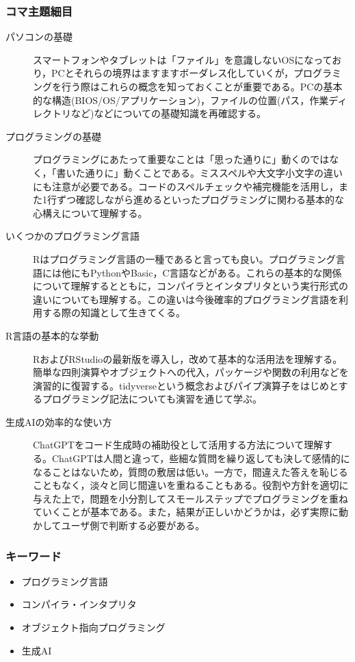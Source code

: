 \subsubsection{コマ主題細目}
\begin{description}
	\item[パソコンの基礎] スマートフォンやタブレットは「ファイル」を意識しないOSになっており，PCとそれらの境界はますますボーダレス化していくが，プログラミングを行う際はこれらの概念を知っておくことが重要である。PCの基本的な構造(BIOS/OS/アプリケーション)，ファイルの位置(パス，作業ディレクトリなど)などについての基礎知識を再確認する。
	
	\item[プログラミングの基礎] プログラミングにあたって重要なことは「思った通りに」動くのではなく，「書いた通りに」動くことである。ミススペルや大文字小文字の違いにも注意が必要である。コードのスペルチェックや補完機能を活用し，また1行ずつ確認しながら進めるといったプログラミングに関わる基本的な心構えについて理解する。

	\item[いくつかのプログラミング言語] Rはプログラミング言語の一種であると言っても良い。プログラミング言語には他にもPythonやBasic，C言語などがある。これらの基本的な関係について理解するとともに，コンパイラとインタプリタという実行形式の違いについても理解する。この違いは今後確率的プログラミング言語を利用する際の知識として生きてくる。

	\item[R言語の基本的な挙動] RおよびRStudioの最新版を導入し，改めて基本的な活用法を理解する。簡単な四則演算やオブジェクトへの代入，パッケージや関数の利用などを演習的に復習する。tidyverseという概念およびパイプ演算子をはじめとするプログラミング記法についても演習を通じて学ぶ。

	\item[生成AIの効率的な使い方] ChatGPTをコード生成時の補助役として活用する方法について理解する。ChatGPTは人間と違って，些細な質問を繰り返しても決して感情的になることはないため，質問の敷居は低い。一方で，間違えた答えを恥じることもなく，淡々と同じ間違いを重ねることもある。役割や方針を適切に与えた上で，問題を小分割してスモールステップでプログラミングを重ねていくことが基本である。また，結果が正しいかどうかは，必ず実際に動かしてユーザ側で判断する必要がある。

\end{description}
\subsubsection{キーワード}
\begin{itemize}
	\item プログラミング言語
	\item コンパイラ・インタプリタ
	\item オブジェクト指向プログラミング
	\item 生成AI
\end{itemize}
